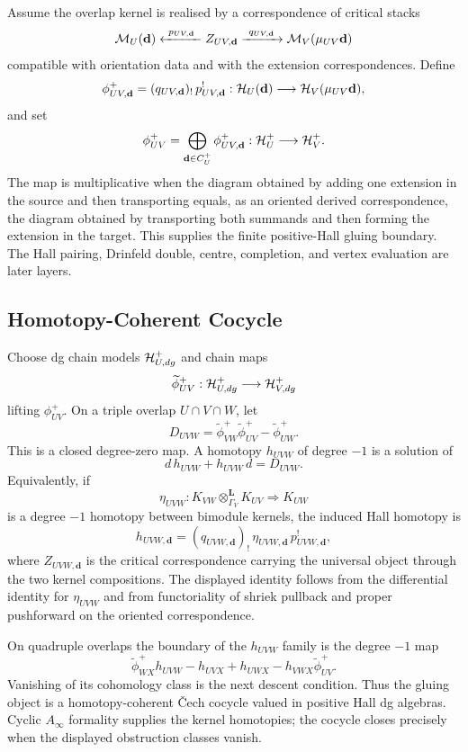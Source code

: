 Assume the overlap kernel is realised by a correspondence of critical
stacks
\[
  \mathcal M_U(\mathbf d)
  \xleftarrow{\ p_{UV,\mathbf d}\ }
  Z_{UV,\mathbf d}
  \xrightarrow{\ q_{UV,\mathbf d}\ }
  \mathcal M_V(\mu_{UV}\mathbf d)
\]
compatible with orientation data and with the extension
correspondences. Define
\[
  \phi^+_{UV,\mathbf d}
  =
  (q_{UV,\mathbf d})_!\,p_{UV,\mathbf d}^{!}:
  \mathcal H_U(\mathbf d)\longrightarrow
  \mathcal H_V(\mu_{UV}\mathbf d),
\]
and set
\[
  \phi^+_{UV}
  =
  \bigoplus_{\mathbf d\in C_U^+}\phi^+_{UV,\mathbf d}:
  \mathcal H_U^+\longrightarrow\mathcal H_V^+ .
\]
The map is multiplicative when the diagram obtained by adding one
extension in the source and then transporting equals, as an oriented
derived correspondence, the diagram obtained by transporting both
summands and then forming the extension in the target. This supplies the
finite positive-Hall gluing boundary. The Hall pairing, Drinfeld double,
centre, completion, and vertex evaluation are later layers.

\subsection*{Homotopy-Coherent Cocycle}

Choose dg chain models \(\mathcal H_{U,dg}^+\) and chain maps
\[
  \widetilde\phi^+_{UV}:\mathcal H_{U,dg}^+\longrightarrow\mathcal H_{V,dg}^+
\]
lifting \(\phi^+_{UV}\). On a triple overlap \(U\cap V\cap W\), let
\[
  D_{UVW}
  =
  \widetilde\phi^+_{VW}\widetilde\phi^+_{UV}
  -
  \widetilde\phi^+_{UW}.
\]
This is a closed degree-zero map. A homotopy \(h_{UVW}\) of degree
\(-1\) is a solution of
\[
  d\,h_{UVW}+h_{UVW}\,d=D_{UVW}.
\]
Equivalently, if
\[
  \eta_{UVW}:
  K_{VW}\otimes^{\mathbf L}_{\Gamma_V}K_{UV}
  \Longrightarrow K_{UW}
\]
is a degree \(-1\) homotopy between bimodule kernels, the induced Hall
homotopy is
\[
  h_{UVW,\mathbf d}
  =
  (q_{UVW,\mathbf d})_!\,
  \eta_{UVW,\mathbf d}\,
  p_{UVW,\mathbf d}^{!},
\]
where \(Z_{UVW,\mathbf d}\) is the critical correspondence carrying the
universal object through the two kernel compositions. The displayed
identity follows from the differential identity for \(\eta_{UVW}\) and
from functoriality of shriek pullback and proper pushforward on the
oriented correspondence.

On quadruple overlaps the boundary of the \(h_{UVW}\) family is the
degree \(-1\) map
\[
  \widetilde\phi^+_{WX}h_{UVW}
  -h_{UVX}
  +h_{UWX}
  -h_{VWX}\widetilde\phi^+_{UV}.
\]
Vanishing of its cohomology class is the next descent condition. Thus
the gluing object is a homotopy-coherent \v{C}ech cocycle valued in
positive Hall dg algebras. Cyclic \(A_\infty\) formality supplies the
kernel homotopies; the cocycle closes precisely when the displayed
obstruction classes vanish.

